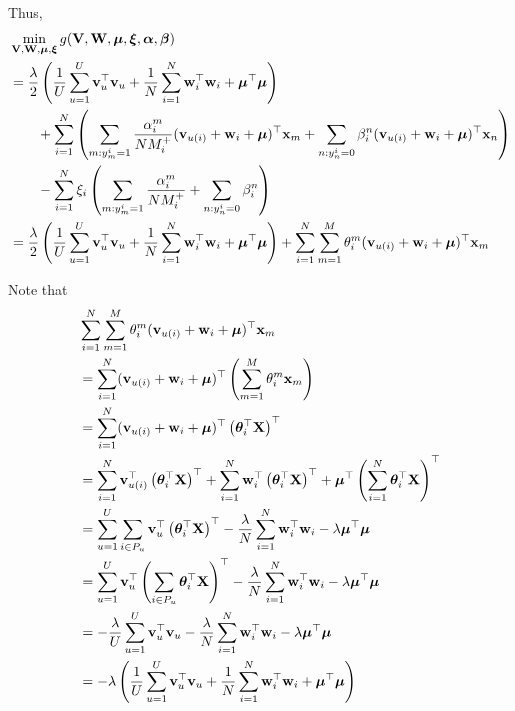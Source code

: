 Thus, 
\begin{equation*}
\begin{aligned}
&\min_{\mathbf{V}, \mathbf{W}, \bm{\mu}, \bm{\xi}} g(\mathbf{V}, \mathbf{W}, \bm{\mu}, \bm{\xi}, {\bm{\alpha}}, {\bm{\beta}}) \\
&= \frac{\lambda}{2} \left( \frac{1}{U} \sum_{u=1}^U \mathbf{v}_u^\top \mathbf{v}_u 
     + \frac{1}{N} \sum_{i=1}^N \mathbf{w}_i^\top \mathbf{w}_i + \bm{\mu}^\top \bm{\mu} \right) \\
& \hspace{2em}
     + \sum_{i=1}^N \left( 
       \sum_{m: y_m^i = 1} \frac{\alpha_i^m}{N M_i^+} (\mathbf{v}_{u(i)} + \mathbf{w}_i + \bm{\mu})^\top \mathbf{x}_m 
     + \sum_{n: y_n^i = 0} \beta_i^n (\mathbf{v}_{u(i)} + \mathbf{w}_i + \bm{\mu})^\top \mathbf{x}_n \right) \\
& \hspace{2em}
     - \sum_{i=1}^N \xi_i \left( \sum_{m: y_m^i = 1} \frac{\alpha_i^m}{N M_i^+} + \sum_{n: y_n^i = 0} \beta_i^n \right) \\
&= \frac{\lambda}{2} \left( \frac{1}{U} \sum_{u=1}^U \mathbf{v}_u^\top \mathbf{v}_u 
     + \frac{1}{N} \sum_{i=1}^N \mathbf{w}_i^\top \mathbf{w}_i + \bm{\mu}^\top \bm{\mu} \right)
     + \sum_{i=1}^N \sum_{m=1}^M \theta_i^m (\mathbf{v}_{u(i)} + \mathbf{w}_i + \bm{\mu})^\top \mathbf{x}_m
\end{aligned}
\end{equation*}

Note that
\begin{equation*}
\begin{aligned}
&\sum_{i=1}^N \sum_{m=1}^M \theta_i^m (\mathbf{v}_{u(i)} + \mathbf{w}_i + \bm{\mu})^\top \mathbf{x}_m \\
&= \sum_{i=1}^N (\mathbf{v}_{u(i)} + \mathbf{w}_i + \bm{\mu})^\top \left( \sum_{m=1}^M \theta_i^m \mathbf{x}_m \right) \\
&= \sum_{i=1}^N (\mathbf{v}_{u(i)} + \mathbf{w}_i + \bm{\mu})^\top \left( \bm{\theta}_i^\top \mathbf{X} \right)^\top \\
&= \sum_{i=1}^N \mathbf{v}_{u(i)}^\top \left( \bm{\theta}_i^\top \mathbf{X} \right)^\top 
     + \sum_{i=1}^N \mathbf{w}_i^\top \left( \bm{\theta}_i^\top \mathbf{X} \right)^\top 
     + \bm{\mu}^\top \left( \sum_{i=1}^N \bm{\theta}_i^\top \mathbf{X} \right)^\top \\
&= \sum_{u=1}^U \sum_{i \in P_u} \mathbf{v}_u^\top \left( \bm{\theta}_i^\top \mathbf{X} \right)^\top
     - \frac{\lambda}{N} \sum_{i=1}^N \mathbf{w}_i^\top \mathbf{w}_i 
     - \lambda \bm{\mu}^\top \bm{\mu} \\
&= \sum_{u=1}^U \mathbf{v}_u^\top \left( \sum_{i \in P_u} \bm{\theta}_i^\top \mathbf{X} \right)^\top
     - \frac{\lambda}{N} \sum_{i=1}^N \mathbf{w}_i^\top \mathbf{w}_i 
     - \lambda \bm{\mu}^\top \bm{\mu} \\
&= -\frac{\lambda}{U} \sum_{u=1}^U \mathbf{v}_u^\top \mathbf{v}_u
     - \frac{\lambda}{N} \sum_{i=1}^N \mathbf{w}_i^\top \mathbf{w}_i 
     - \lambda \bm{\mu}^\top \bm{\mu} \\
&= -\lambda \left( \frac{1}{U} \sum_{u=1}^U \mathbf{v}_u^\top \mathbf{v}_u
     + \frac{1}{N} \sum_{i=1}^N \mathbf{w}_i^\top \mathbf{w}_i 
     + \bm{\mu}^\top \bm{\mu} \right)
\end{aligned}
\end{equation*}

